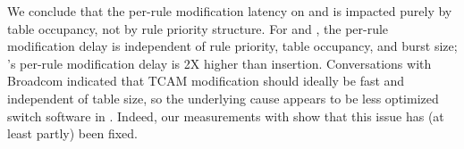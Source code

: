 We conclude that the per-rule modification latency on \BroadcomOne and \IBM is 
impacted purely by table occupancy, not by rule priority structure.
For \BroadcomThree and \Intel, the per-rule modification delay 
is independent of rule priority, table occupancy, and burst size;
\BroadcomThree's per-rule modification delay is 2X higher than insertion.
Conversations with Broadcom indicated that TCAM modification should ideally be fast and independent of table size, 
so the underlying cause appears to be less optimized switch software in \BroadcomOne. Indeed, our measurements with \BroadcomThree show that this issue has (at least partly) been fixed.

